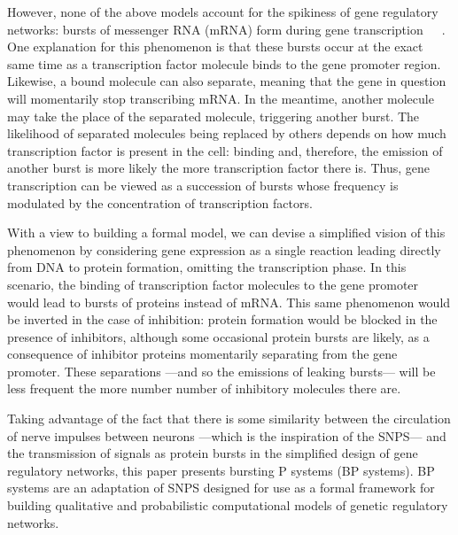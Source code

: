 \documentclass[runningheads,a4paper]{llncs}
\begin{document}
However, none of the above models account for the spikiness of gene regulatory networks: bursts of messenger RNA (mRNA) form during gene transcription~\cite{Golding2005}~\cite{Chubb2006}~\cite{Raj2006}. One explanation for this phenomenon is that these bursts occur at the exact same time as a transcription factor molecule binds to the gene promoter region. Likewise, a bound molecule can also separate, meaning that the gene in question will momentarily stop transcribing mRNA. In the meantime, another molecule may take the place of the separated molecule, triggering another burst. The likelihood of separated molecules being replaced by others depends on how much transcription factor is present in the cell: binding and, therefore, the emission of another burst is more likely the more transcription factor there is. Thus, gene transcription can be viewed as a succession of bursts whose frequency is modulated by the concentration of transcription factors.

With a view to building a formal model, we can devise a simplified vision of this phenomenon by considering gene expression as a single reaction leading directly from DNA to protein formation, omitting the transcription phase. In this scenario, the binding of transcription factor molecules to the gene promoter would lead to bursts of proteins instead of mRNA. This same phenomenon would be inverted in the case of inhibition: protein formation would be blocked in the presence of inhibitors, although some occasional protein bursts are likely, as a consequence of inhibitor proteins momentarily separating from the gene promoter. These separations ---and so the emissions of leaking bursts--- will be less frequent the more number number of inhibitory molecules there are.

Taking advantage of the fact that there is some similarity between the circulation of nerve impulses between neurons ---which is the inspiration of the SNPS--- and the transmission of signals as protein bursts in the simplified design of gene regulatory networks, this paper presents bursting P systems (BP systems). BP systems are an adaptation of SNPS designed for use as a formal framework for building qualitative and probabilistic computational models of genetic regulatory networks.
%
\end{document}
